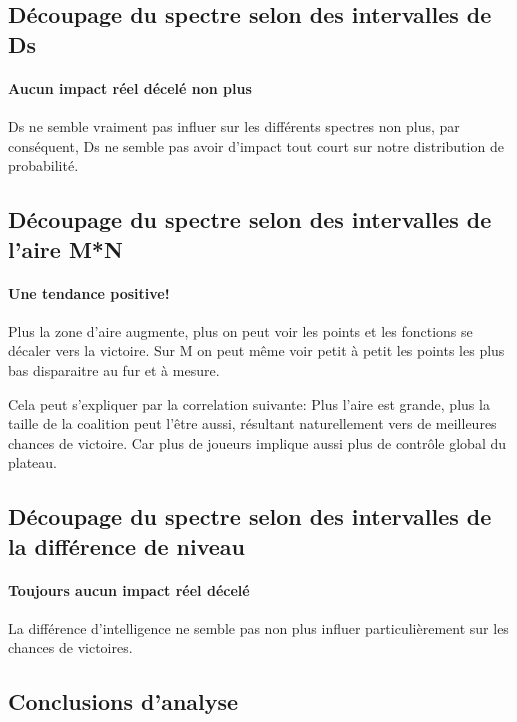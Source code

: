 \subsection{Découpage du spectre selon des intervalles de Ds}
\paragraph{Aucun impact réel décelé non plus}
Ds ne semble vraiment pas influer sur les différents spectres non plus, par conséquent, Ds ne semble pas avoir d'impact tout court sur notre distribution de probabilité.


\subsection{Découpage du spectre selon des intervalles de l'aire M*N}
\paragraph{Une tendance positive!}
Plus la zone d'aire augmente, plus on peut voir les points et les fonctions se décaler vers la victoire.
Sur M on peut même voir petit à petit les points les plus bas disparaitre au fur et à mesure. 

\begin{info}
	Cela peut s'expliquer par la correlation suivante: Plus l'aire est grande, plus la taille de la coalition peut l'être aussi, résultant naturellement vers de meilleures chances de victoire. Car plus de joueurs implique aussi plus de contrôle global du plateau.
\end{info}



\subsection{Découpage du spectre selon des intervalles de la différence de niveau}
\paragraph{Toujours aucun impact réel décelé}
La différence d'intelligence ne semble pas non plus influer particulièrement sur les chances de victoires.


\subsection{Conclusions d'analyse}
